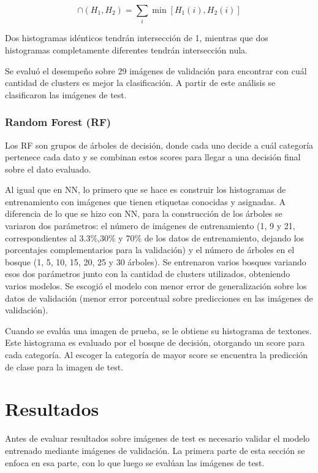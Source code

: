 \documentclass[10pt,twocolumn,letterpaper]{article}
\begin{document}
\begin{equation}
\cap(H_{1}, H_{2})=\sum_{i}\min{[H_{1}(i),H_{2}(i)]}
\end{equation}
\cite{Interseccion}


Dos histogramas idénticos tendrán intersección de 1, mientras que dos histogramas completamente diferentes tendrán intersección nula.

Se evaluó el desempeño sobre 29 imágenes de validación para encontrar con cuál cantidad de clusters es mejor la clasificación. A partir de este análisis se clasificaron las imágenes de test.

\subsubsection{Random Forest (RF)}
Los RF son grupos de árboles de decisión, donde cada uno decide a cuál categoría pertenece cada dato y se combinan estos scores para llegar a una decisión final sobre el dato evaluado.

Al igual que en NN, lo primero que se hace es construir los histogramas de entrenamiento con imágenes que tienen etiquetas conocidas y asignadas. A diferencia de lo que se hizo con NN, para la construcción de los árboles se variaron dos parámetros: el número de imágenes de entrenamiento (1, 9 y 21, correspondientes al 3.3\%,30\% y 70\% de los datos de entrenamiento, dejando los porcentajes complementarios para la validación) y el número de árboles en el bosque (1, 5, 10, 15, 20, 25 y 30 árboles). Se entrenaron varios bosques variando esos dos parámetros junto con la cantidad de clusters utilizados, obteniendo varios modelos. Se escogió el modelo con menor error de generalización sobre los datos de validación (menor error porcentual sobre predicciones en las imágenes de validación).

Cuando se evalúa una imagen de prueba, se le obtiene su histograma de textones. Este histograma es evaluado por el bosque de decisión, otorgando un score para cada categoría. Al escoger la categoría de mayor score se encuentra la predicción de clase para la imagen de test.
\section{Resultados}
Antes de evaluar resultados sobre imágenes de test es necesario validar el modelo entrenado mediante imágenes de validación. La primera parte de esta sección se enfoca en esa parte, con lo que luego se evalúan las imágenes de test.
\end{document}

